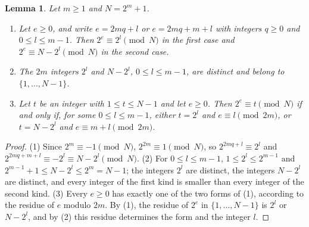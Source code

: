 \documentclass[11pt]{amsart}
\newtheorem{Lemma}[Theorem]{Lemma}
\theoremstyle{definition}
\begin{document}
\begin{Lemma}
\label{lem:order}
Let $m\ge1$ and $N=2^m+1$.
\begin{enumerate}
\item Let $e\ge0$, and write $e=2mq+l$ or $e=2mq+m+l$ with integers $q\ge0$ and $0\le l\le m-1$. Then $2^e\equiv2^l\pmod N$ in the first case and $2^e\equiv N-2^l\pmod N$ in the second case.
\item The $2m$ integers $2^l$ and $N-2^l$, $0\le l\le m-1$, are distinct and belong to $\{1,\dots,N-1\}$.
\item Let $t$ be an integer with $1\le t\le N-1$ and let $e\ge0$. Then $2^e\equiv t\pmod N$ if and only if, for some $0\le l\le m-1$, either $t=2^l$ and $e\equiv l\pmod{2m}$, or $t=N-2^l$ and $e\equiv m+l\pmod{2m}$.
\end{enumerate}
\end{Lemma}
\begin{proof}
(1) Since $2^m\equiv-1\pmod N$, $2^{2m}\equiv1\pmod N$, so $2^{2mq+l}\equiv2^l$ and $2^{2mq+m+l}\equiv-2^l\equiv N-2^l\pmod N$. (2) For $0\le l\le m-1$, $1\le2^l\le2^{m-1}$ and $2^{m-1}+1\le N-2^l\le2^m=N-1$; the integers $2^l$ are distinct, the integers $N-2^l$ are distinct, and every integer of the first kind is smaller than every integer of the second kind. (3) Every $e\ge0$ has exactly one of the two forms of (1), according to the residue of $e$ modulo $2m$. By (1), the residue of $2^e$ in $\{1,\dots,N-1\}$ is $2^l$ or $N-2^l$, and by (2) this residue determines the form and the integer $l$.
\end{proof}
\end{document}
